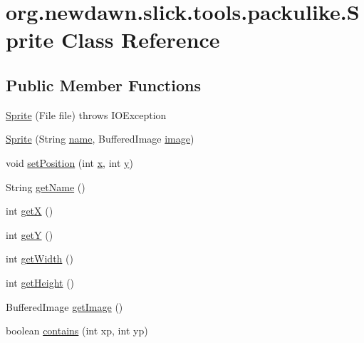 \hypertarget{classorg_1_1newdawn_1_1slick_1_1tools_1_1packulike_1_1_sprite}{}\section{org.\+newdawn.\+slick.\+tools.\+packulike.\+Sprite Class Reference}
\label{classorg_1_1newdawn_1_1slick_1_1tools_1_1packulike_1_1_sprite}
\subsection*{Public Member Functions}
\begin{DoxyCompactItemize}
\item 
\mbox{\hyperlink{classorg_1_1newdawn_1_1slick_1_1tools_1_1packulike_1_1_sprite_a9ff192e45876e68fe79a7ec2b5639434}{Sprite}} (File file)  throws I\+O\+Exception 
\item 
\mbox{\hyperlink{classorg_1_1newdawn_1_1slick_1_1tools_1_1packulike_1_1_sprite_a16d8d848f46dc7b60cbfcfad58c351f5}{Sprite}} (String \mbox{\hyperlink{classorg_1_1newdawn_1_1slick_1_1tools_1_1packulike_1_1_sprite_a8cad2e7ed5b25766e5b16d76a96ce831}{name}}, Buffered\+Image \mbox{\hyperlink{classorg_1_1newdawn_1_1slick_1_1tools_1_1packulike_1_1_sprite_a021954101cf2a5afc580af29559ab4e5}{image}})
\item 
void \mbox{\hyperlink{classorg_1_1newdawn_1_1slick_1_1tools_1_1packulike_1_1_sprite_a98b73bd8d5d4b8be846dba03956c2806}{set\+Position}} (int \mbox{\hyperlink{classorg_1_1newdawn_1_1slick_1_1tools_1_1packulike_1_1_sprite_a9bd0b6392ca72a997c8bbd9631fb6dab}{x}}, int \mbox{\hyperlink{classorg_1_1newdawn_1_1slick_1_1tools_1_1packulike_1_1_sprite_a513b034525fe70842f69ff900ab3783a}{y}})
\item 
String \mbox{\hyperlink{classorg_1_1newdawn_1_1slick_1_1tools_1_1packulike_1_1_sprite_a482ded8b99a8590bb19b3afafc515ff0}{get\+Name}} ()
\item 
int \mbox{\hyperlink{classorg_1_1newdawn_1_1slick_1_1tools_1_1packulike_1_1_sprite_a45f6274c3c05f88820b9bbdfcba8e902}{getX}} ()
\item 
int \mbox{\hyperlink{classorg_1_1newdawn_1_1slick_1_1tools_1_1packulike_1_1_sprite_ae418a8002a72f73525e4a516d6ad84d4}{getY}} ()
\item 
int \mbox{\hyperlink{classorg_1_1newdawn_1_1slick_1_1tools_1_1packulike_1_1_sprite_a09b39bcf1788b4a2e3d9e2ce12cb0d7a}{get\+Width}} ()
\item 
int \mbox{\hyperlink{classorg_1_1newdawn_1_1slick_1_1tools_1_1packulike_1_1_sprite_a1a2887d89a3322c78211fd132987c335}{get\+Height}} ()
\item 
Buffered\+Image \mbox{\hyperlink{classorg_1_1newdawn_1_1slick_1_1tools_1_1packulike_1_1_sprite_a59f9f148d202bc3c25680bfd0bc7660c}{get\+Image}} ()
\item 
boolean \mbox{\hyperlink{classorg_1_1newdawn_1_1slick_1_1tools_1_1packulike_1_1_sprite_a54369795408db83608e37298cb02de94}{contains}} (int xp, int yp)
\end{DoxyCompactItemize}
